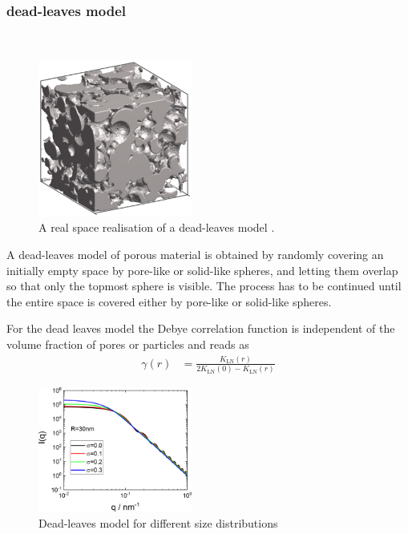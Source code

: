 \newpage
\subsubsection{dead-leaves model}~\\

\begin{figure}[htb]
\begin{center}
\includegraphics[width=0.45\textwidth]{../images/form_factor/nonparticular/dead_leaves_3D.png}
\end{center}
\caption{A real space realisation of a dead-leaves model \cite{Gommes2018}.} \label{fig:DeadLeaves3D}
\end{figure}

A dead-leaves model of porous material is obtained by randomly covering an
initially empty space by pore-like or solid-like spheres, and letting
them overlap so that only the topmost sphere is visible. The process has to be continued until the
entire space is covered either by pore-like or solid-like spheres.

For the dead leaves model the Debye correlation function is independent of the volume fraction of pores or particles and reads as
\begin{align}\label{eq:DebyeCorrelationDeadLeaves}
  \gamma(r) &= \frac{K_\mathrm{LN}(r)}{2K_\mathrm{LN}(0)-K_\mathrm{LN}(r)}
\end{align}

\begin{figure}[htb]
\begin{center}
\includegraphics[width=0.45\textwidth]{../images/form_factor/nonparticular/dead_leaves.png}
\end{center}
\caption{Dead-leaves model for different size distributions} \label{fig:DeadLeavesIQ}
\end{figure}

